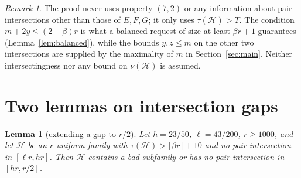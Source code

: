 \documentclass[11pt]{amsart}
\newtheorem{lemma}[theorem]{Lemma}
\theoremstyle{definition}
\theoremstyle{remark}
\newtheorem{remark}[theorem]{Remark}
\newcommand{\cH}{\mathcal H}
\newcommand{\ceil}[1]{\lceil #1\rceil}
\begin{document}
\begin{remark}
The proof never uses property $(7,2)$ or any information about pair intersections other than those of $E,F,G$; it only uses $\tau(\cH)>T$. The condition $m+2y\le(2-\beta)r$ is what a balanced request of size at least $\beta r+1$ guarantees (Lemma~\ref{lem:balanced}), while the bounds $y,z\le m$ on the other two intersections are supplied by the maximality of $m$ in Section~\ref{sec:main}. Neither intersectingness nor any bound on $\nu(\cH)$ is assumed.
\end{remark}

\section{Two lemmas on intersection gaps}\label{sec:gap}

\begin{lemma}[extending a gap to $r/2$]\label{lem:gapext}
Let $h=23/50$, $\ell=43/200$, $r\ge1000$, and let $\cH$ be an $r$-uniform family with $\tau(\cH)>\ceil{\beta r}+10$ and no pair intersection in $[\ell r,hr]$. Then $\cH$ contains a bad subfamily or has no pair intersection in $[hr,r/2]$.
\end{lemma}
\end{document}
